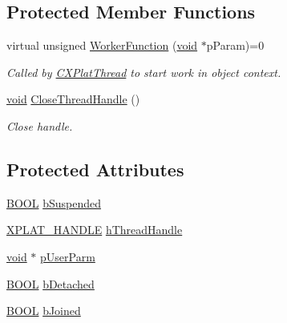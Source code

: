 \subsection*{\-Protected \-Member \-Functions}
\begin{DoxyCompactItemize}
\item 
virtual unsigned \hyperlink{class_c_x_plat_thread_af8a15900817f9673c6fd8e85cdedf27d}{\-Worker\-Function} (\hyperlink{_cpclient_8h_a6464f7480a0fd0ee170cba12b2c0497f}{void} $\ast$p\-Param)=0
\begin{DoxyCompactList}\small\item\em \-Called by \hyperlink{class_c_x_plat_thread}{\-C\-X\-Plat\-Thread} to start work in object context. \end{DoxyCompactList}\item 
\hyperlink{_cpclient_8h_a6464f7480a0fd0ee170cba12b2c0497f}{void} \hyperlink{class_c_x_plat_thread_aa7337490cd6399730aaeee9497835455}{\-Close\-Thread\-Handle} ()
\begin{DoxyCompactList}\small\item\em \-Close handle. \end{DoxyCompactList}\end{DoxyCompactItemize}
\subsection*{\-Protected \-Attributes}
\begin{DoxyCompactItemize}
\item 
\hyperlink{_cpclient_8h_a3be13892ae7076009afcf121347dd319}{\-B\-O\-O\-L} \hyperlink{class_c_x_plat_thread_a91939e9102e3d7a3be728e861e2e4344}{b\-Suspended}
\item 
\hyperlink{_x_plat_8h_af3c5c1485bb09f4be888d78cdaf93e00}{\-X\-P\-L\-A\-T\-\_\-\-H\-A\-N\-D\-L\-E} \hyperlink{class_c_x_plat_thread_af20b7c1d6babaa0ecb429d3e6d846cc4}{h\-Thread\-Handle}
\item 
\hyperlink{_cpclient_8h_a6464f7480a0fd0ee170cba12b2c0497f}{void} $\ast$ \hyperlink{class_c_x_plat_thread_a836a233113a162ba4628478b1e230dcf}{p\-User\-Parm}
\item 
\hyperlink{_cpclient_8h_a3be13892ae7076009afcf121347dd319}{\-B\-O\-O\-L} \hyperlink{class_c_x_plat_thread_aebdedede286d9cf03841c44615478e4a}{b\-Detached}
\item 
\hyperlink{_cpclient_8h_a3be13892ae7076009afcf121347dd319}{\-B\-O\-O\-L} \hyperlink{class_c_x_plat_thread_a15720f77b93771acd0d2b59f042eb8d6}{b\-Joined}
\end{DoxyCompactItemize}


